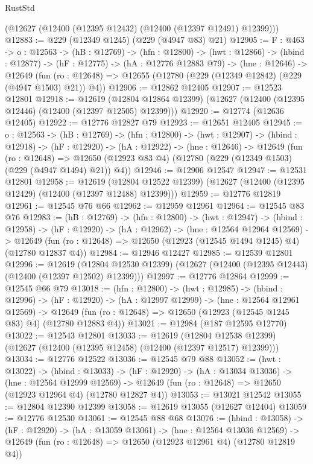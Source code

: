 \begin{lexlean}{RustStd}
\begin{coremodule}
    (@12627 (@12400 (@12395 @12432) (@12400 (@12397 @12491) @12399)))
@12883 := @229 (@12349 @1245) (@229 (@4947 @83) @21)
@12905 := {F : @463} ->
  {o : @12563} ->
  (hB : @12769) ->
  (hfn : @12800) ->
  (hwt : @12866) ->
  (hbind : @12877) ->
  (hF : @12775) ->
  (hA : @12776 @12883 @79) ->
  (hne : @12646) ->
  @12649 (fun (ro : @12648) => @12655 (@12780 (@229 (@12349 @12842) (@229 (@4947 @1503) @21)) @4))
@12906 := @12862 @12405
@12907 := @12523 @12801
@12918 := @12619
    (@12804 @12864 @12399)
    (@12627 (@12400 (@12395 @12446) (@12400 (@12397 @12505) @12399)))
@12920 := @12774 (@12636 @12405)
@12922 := @12776 @12827 @79
@12923 := @12651 @12405
@12945 := {o : @12563} ->
  (hB : @12769) ->
  (hfn : @12800) ->
  (hwt : @12907) ->
  (hbind : @12918) ->
  (hF : @12920) ->
  (hA : @12922) ->
  (hne : @12646) ->
  @12649
    (fun (ro : @12648) =>
    @12650 (@12923 @83 @4) (@12780 (@229 (@12349 @1503) (@229 (@4947 @1494) @21)) @4))
@12946 := @12906 @12547
@12947 := @12531 @12801
@12958 := @12619
    (@12804 @12522 @12399)
    (@12627 (@12400 (@12395 @12429) (@12400 (@12397 @12488) @12399)))
@12959 := @12776 @12819
@12961 := @12545 @76 @66
@12962 := @12959 @12961
@12964 := @12545 @83 @76
@12983 := (hB : @12769) ->
  (hfn : @12800) ->
  (hwt : @12947) ->
  (hbind : @12958) ->
  (hF : @12920) ->
  (hA : @12962) ->
  (hne : @12564 @12964 @12569) ->
  @12649 (fun (ro : @12648) => @12650 (@12923 (@12545 @1494 @1245) @4) (@12780 @12837 @4))
@12984 := @12946 @12427
@12985 := @12539 @12801
@12996 := @12619
    (@12804 @12530 @12399)
    (@12627 (@12400 (@12395 @12443) (@12400 (@12397 @12502) @12399)))
@12997 := @12776 @12864
@12999 := @12545 @66 @79
@13018 := (hfn : @12800) ->
  (hwt : @12985) ->
  (hbind : @12996) ->
  (hF : @12920) ->
  (hA : @12997 @12999) ->
  (hne : @12564 @12961 @12569) ->
  @12649 (fun (ro : @12648) => @12650 (@12923 (@12545 @1245 @83) @4) (@12780 @12883 @4))
@13021 := @12984 (@187 @12595 @12770)
@13022 := @12543 @12801
@13033 := @12619
    (@12804 @12538 @12399)
    (@12627 (@12400 (@12395 @12458) (@12400 (@12397 @12517) @12399)))
@13034 := @12776 @12522
@13036 := @12545 @79 @88
@13052 := (hwt : @13022) ->
  (hbind : @13033) ->
  (hF : @12920) ->
  (hA : @13034 @13036) ->
  (hne : @12564 @12999 @12569) ->
  @12649 (fun (ro : @12648) => @12650 (@12923 @12964 @4) (@12780 @12827 @4))
@13053 := @13021 @12542
@13055 := @12804 @12390 @12399
@13058 := @12619 @13055 (@12627 @12404)
@13059 := @12776 @12530
@13061 := @12545 @88 @68
@13076 := (hbind : @13058) ->
  (hF : @12920) ->
  (hA : @13059 @13061) ->
  (hne : @12564 @13036 @12569) ->
  @12649 (fun (ro : @12648) => @12650 (@12923 @12961 @4) (@12780 @12819 @4))

\end{coremodule}
\end{lexlean}
